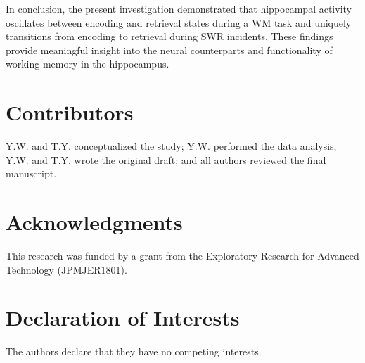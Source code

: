 \documentclass[final,3p,times,twocolumn]{elsarticle}
\begin{document}
In conclusion, the present investigation demonstrated that hippocampal activity oscillates between encoding and retrieval states during a WM task and uniquely transitions from encoding to retrieval during SWR incidents. These findings provide meaningful insight into the neural counterparts and functionality of working memory in the hippocampus.
\label{sec:discussion}






% 

% 




\section*{Contributors}
Y.W. and T.Y. conceptualized the study; Y.W. performed the data analysis; Y.W. and T.Y. wrote the original draft; and all authors reviewed the final manuscript.
\label{contributors}

\section*{Acknowledgments}
This research was funded by a grant from the Exploratory Research for Advanced Technology (JPMJER1801).
\label{acknowledgments}

\section*{Declaration of Interests}
The authors declare that they have no competing interests.
\label{declaration of interests}
\end{document}
